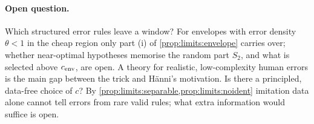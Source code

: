 \paragraph{Open question.}\label{q:limits:open}
Which structured error rules leave a window? For envelopes with error density $\theta<1$ in the cheap region only part (i) of \cref{prop:limits:envelope} carries over; whether near-optimal hypotheses memorise the random part $S_2$, and what is selected above $c_{\rm env}$, are open. A theory for realistic, low-complexity human errors is the main gap between the trick and H\"anni's motivation. Is there a principled, data-free choice of $c$? By \cref{prop:limits:separable,prop:limits:noident} imitation data alone cannot tell errors from rare valid rules; what extra information would suffice is open.
